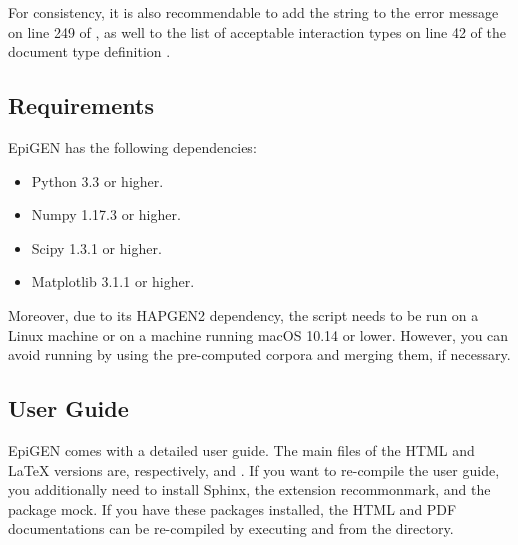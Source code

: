 \documentclass[a4paper,10pt,english]{sphinxhowto}
\begin{document}
For consistency, it is also recommendable to add the string  to the error message on line 249 of , as well to the list of acceptable interaction types on line 42 of the document type definition .


\subsection{Requirements}
\label{\detokenize{README:requirements}}
EpiGEN has the following dependencies:
\begin{itemize}
\item {} 
Python 3.3 or higher.

\item {} 
Numpy 1.17.3 or higher.

\item {} 
Scipy 1.3.1 or higher.

\item {} 
Matplotlib 3.1.1 or higher.

\end{itemize}

Moreover, due to its HAPGEN2 dependency, the script  needs to be run on a Linux machine or on a machine running macOS 10.14 or lower. However, you can avoid running  by using the pre-computed corpora and merging them, if necessary.


\subsection{User Guide}
\label{\detokenize{README:user-guide}}
EpiGEN comes with a detailed user guide. The main files of the HTML and LaTeX versions are, respectively,  and .  If you want to re-compile the user guide, you additionally need to install Sphinx, the extension recommonmark, and the package mock. If you have these packages installed, the HTML and PDF documentations can be re-compiled by executing  and  from the  directory.
\end{document}
